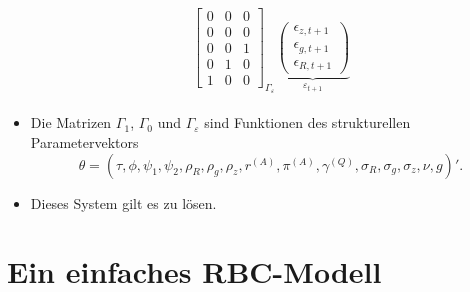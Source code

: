 \documentclass[10pt]{beamer}  %
\begin{document}
\begin{frame}
\begin{itemize}
\begin{scriptsize}
\begin{align*}
\begin{split}
{\begin{bmatrix}
    0&0&0\\
    0&0&0\\
    0&0&1\\
    0&1&0\\
    1&0&0
  \end{bmatrix}}_{\Gamma_\varepsilon}
  \underbrace{\begin{pmatrix}
  \epsilon_{z,t+1}\\ \epsilon_{g,t+1}\\ \epsilon_{R,t+1}
  \end{pmatrix}}_{\varepsilon_{t+1}}
\end{split}
\end{align*}\end{scriptsize}
\item Die Matrizen $\Gamma_1$, $\Gamma_0$ und $\Gamma_\varepsilon$ sind Funktionen des strukturellen Parametervektors
\begin{equation*}
\theta=(\tau,\phi,\psi_1,\psi_2,\rho_R,\rho_g,\rho_z, r^{(A)},\pi^{(A)},\gamma^{(Q)},\sigma_R,\sigma_g,\sigma_z,\nu,g)'.
\end{equation*}
\item Dieses System gilt es zu l\"{o}sen.
\end{itemize}
\end{frame}

\section{Ein einfaches RBC-Modell}
\end{document}
